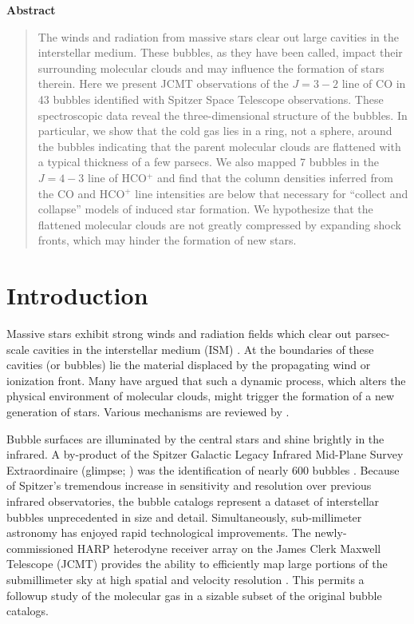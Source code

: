\begin{center}
\bfseries Abstract
\end{center}
\begin{quote}

The winds and radiation from massive stars clear out large cavities in
the interstellar medium. These bubbles, as they have been called,
impact their surrounding molecular clouds and may influence the
formation of stars therein. Here we present JCMT observations of the
$J=3-2$ line of CO in 43 bubbles identified with Spitzer Space
Telescope observations. These spectroscopic data reveal the
three-dimensional structure of the bubbles.
In particular, we show that the cold gas lies in a
ring, not a sphere, around the
bubbles indicating that the parent molecular clouds
are flattened with a typical thickness of a few parsecs.
We also mapped 7 bubbles in the $J=4-3$ line of HCO$^+$
and find that the column densities inferred from the
CO and HCO$^+$ line intensities are below that necessary
for ``collect and collapse'' models of induced star formation. We hypothesize that
the flattened molecular clouds are not greatly compressed by expanding
shock fronts, which may hinder the formation of new stars.

\end{quote}

\section{Introduction}
\label{sec:intro_ch2_bubbles}

Massive stars exhibit strong winds and radiation fields which clear
out parsec-scale cavities in the interstellar medium (ISM) \citep{Castor75, Weaver77}.
At the boundaries of these cavities (or bubbles) lie the
material displaced by the propagating wind or ionization front. Many
have argued that such a dynamic process, which alters the physical
environment of molecular clouds, might trigger the formation of a
new generation of stars. Various mechanisms are reviewed by .

Bubble surfaces are illuminated by the central stars and shine brightly
in the infrared. A by-product of the Spitzer Galactic Legacy Infrared
Mid-Plane Survey Extraordinaire ({\sc glimpse}; \citealt{Benjamin03})
was the identification of nearly 600 bubbles \citep{Churchwell06, Churchwell07}.
Because of Spitzer's tremendous increase in
sensitivity and resolution over previous infrared observatories, the
\glimpse bubble catalogs represent a dataset of interstellar
bubbles unprecedented in size and detail.  Simultaneously,
sub-millimeter astronomy has enjoyed rapid technological
improvements. The newly-commissioned HARP heterodyne receiver
array on the James Clerk Maxwell Telescope (JCMT) provides the
ability to efficiently map large portions of the submillimeter sky at high
spatial and velocity resolution \citep{Smith08}. This
permits a followup study of the molecular gas in a sizable
subset of the original bubble catalogs.

